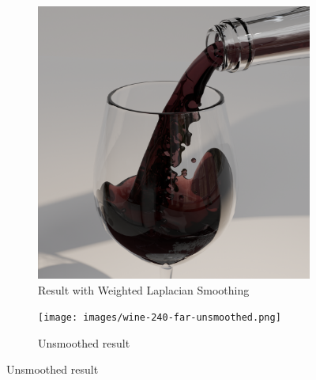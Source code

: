 \documentclass[oneside, a4paper]{book}
\begin{document}
  \begin{figure}
    \centering
    \begin{subfigure}[t][0.5\textwidth]{0.5\textwidth}
      \includegraphics[width=\textwidth]{images/wine-240-far-smoothed.png}
      \caption{Result with Weighted Laplacian Smoothing}
      \label{fig:glass-a}
    \end{subfigure}%
    \begin{subfigure}[t][0.5\textwidth]{0.5\textwidth}
      \texttt{[image: images/wine-240-far-unsmoothed.png]}
      \caption{Unsmoothed result}
      \label{fig:glass-b}
    \end{subfigure}\vspace{1cm}



\end{figure}
\end{document}

